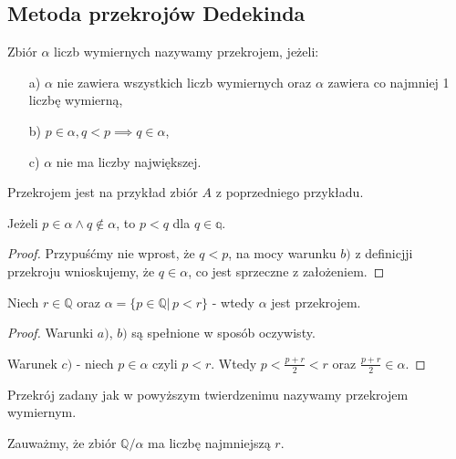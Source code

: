 \subsection{Metoda przekrojów Dedekinda}
\begin{definicja}
Zbiór $\alpha$ liczb wymiernych nazywamy przekrojem, jeżeli:
\begin{enumerate}
\item[a)] $\alpha$ nie zawiera wszystkich liczb wymiernych oraz $\alpha$ zawiera co najmniej 1 liczbę wymierną,
\item[b)] $p\in\alpha, q<p \implies q\in\alpha$,
\item[c)] $\alpha$ nie ma liczby największej.
\end{enumerate}
\end{definicja}

Przekrojem jest na przykład zbiór $A$ z poprzedniego przykładu.

\begin{twierdzenie}
Jeżeli $p\in\alpha \wedge q\notin \alpha$, to $p<q$ dla $q\in\mathbb{q}$.
\end{twierdzenie}
\begin{proof}
Przypuśćmy nie wprost, że $q < p$, na mocy warunku $b)$ z definicjji przekroju wnioskujemy, że $q\in\alpha$, co jest sprzeczne z założeniem.
\end{proof}

\begin{twierdzenie}
Niech $r\in\mathbb{Q}$ oraz $\alpha = \{ p\in\mathbb{Q} | \, p<r \}$ - wtedy $\alpha$ jest przekrojem.
\end{twierdzenie}
\begin{proof}
Warunki $a)$, $b)$ są spełnione w sposób oczywisty.

Warunek $c)$ - niech $p\in\alpha$ czyli $p<r$. Wtedy $p < \frac{p+r}{2} < r$ oraz $\frac{p+r}{2}\in\alpha.$
\end{proof}

\begin{definicja}
Przekrój zadany jak w powyższym twierdzenimu nazywamy przekrojem wymiernym.
\end{definicja}
Zauważmy, że zbiór $\mathbb{Q}/\alpha$ ma liczbę najmniejszą $r$.

